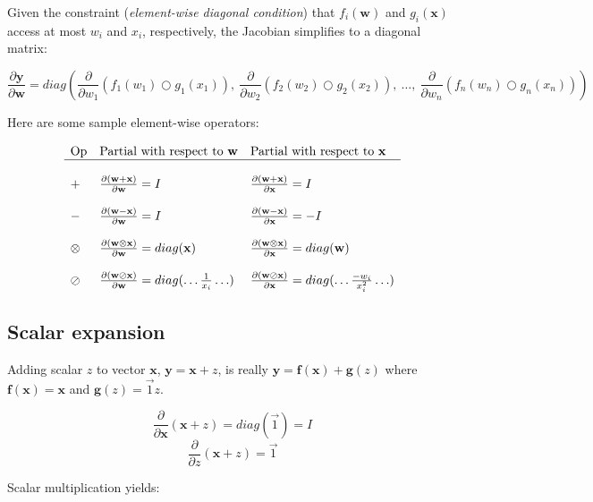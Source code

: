 \documentclass[11pt]{article}
\begin{document}
Given the constraint ({\em element-wise diagonal condition}) that $f_i(\mathbf{w})$ and $g_i(\mathbf{x})$ access at most $w_i$ and $x_i$, respectively, the Jacobian simplifies to a diagonal matrix:

\[
\frac{\partial \mathbf{y}}{\partial \mathbf{w}} = diag \left( \frac{\partial}{\partial w_1}(f_{1}(w_1) \bigcirc g_{1}(x_1)),~ \frac{\partial}{\partial w_2}(f_{2}(w_2) \bigcirc g_{2}(x_2)),~ \ldots,~ \frac{\partial}{\partial w_n}(f_{n}(w_n) \bigcirc g_{n}(x_n)) \right)
\]

Here are some sample element-wise  operators:

\[
\begin{array}{lll}
\text{Op} & \text{Partial with respect to } \mathbf{w} & \text{Partial with respect to }\mathbf{x}\\
\hline\\
+ & \frac{\partial (\mathbf{w+x})}{\partial \mathbf{w}} = I & \frac{\partial (\mathbf{w+x})}{\partial \mathbf{x}} =  I\\\\
- & \frac{\partial (\mathbf{w-x})}{\partial \mathbf{w}}  = I & \frac{\partial (\mathbf{w-x})}{\partial \mathbf{x}}  = -I \\\\
\otimes & \frac{\partial (\mathbf{w \otimes x})}{\partial \mathbf{w}}  =  diag(\mathbf{x}) & \frac{\partial (\mathbf{w \otimes x})}{\partial \mathbf{x}}  =  diag(\mathbf{w})\\\\
\oslash & \frac{\partial (\mathbf{w \oslash x})}{\partial \mathbf{w}}  =  diag(\ldots \frac{1}{x_i} \ldots) & \frac{\partial (\mathbf{w \oslash x})}{\partial \mathbf{x}}  =  diag(\ldots \frac{-w_i}{x_i^2} \ldots)\\
\end{array}
\]

\subsection{Scalar expansion}

Adding scalar $z$  to vector $\mathbf{x}$, $\mathbf{y} = \mathbf{x} + z$, is really $\mathbf{y} = \mathbf{f(x)} + \mathbf{g}(z)$ where $\mathbf{f(x)} = \mathbf{x}$ and $\mathbf{g}(z) = \vec{1} z$.

\[
\frac{\partial}{\partial \mathbf{x}} ( \mathbf{x} + z ) = diag(\vec{1}) = I
\]
\[
\frac{\partial}{\partial z} ( \mathbf{x} + z ) = \vec{1}
\]

Scalar multiplication yields:
\end{document}
